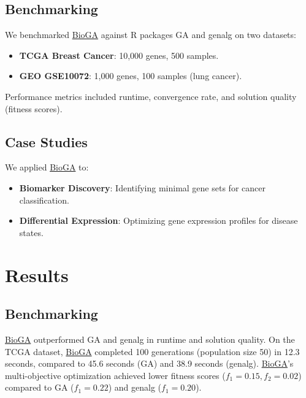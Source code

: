 \documentclass{report}
\begin{document}
\subsection{Benchmarking}
We benchmarked \textcolor{teal}{\href{https://bioconductor.org/packages/release/bioc/html/BioGA.html}{BioGA}} against R packages GA \citep{Scrucca2013} and genalg on two datasets:
\begin{itemize}
    \item \textbf{TCGA Breast Cancer}: 10,000 genes, 500 samples.
    \item \textbf{GEO GSE10072}: 1,000 genes, 100 samples (lung cancer).
\end{itemize}
Performance metrics included runtime, convergence rate, and solution quality (fitness scores).

\subsection{Case Studies}
We applied \textcolor{teal}{\href{https://bioconductor.org/packages/release/bioc/html/BioGA.html}{BioGA}} to:
\begin{itemize}
    \item \textbf{Biomarker Discovery}: Identifying minimal gene sets for cancer classification.
    \item \textbf{Differential Expression}: Optimizing gene expression profiles for disease states.
\end{itemize}


\section{Results}
\subsection{Benchmarking}
\textcolor{teal}{\href{https://bioconductor.org/packages/release/bioc/html/BioGA.html}{BioGA}} outperformed GA and genalg in runtime and solution quality. On the TCGA dataset, \textcolor{teal}{\href{https://bioconductor.org/packages/release/bioc/html/BioGA.html}{BioGA}} completed 100 generations (population size 50) in 12.3 seconds, compared to 45.6 seconds (GA) and 38.9 seconds (genalg). \textcolor{teal}{\href{https://bioconductor.org/packages/release/bioc/html/BioGA.html}{BioGA}}’s multi-objective optimization achieved lower fitness scores (\( f_1 = 0.15, f_2 = 0.02 \)) compared to GA (\( f_1 = 0.22 \)) and genalg (\( f_1 = 0.20 \)).
\end{document}
